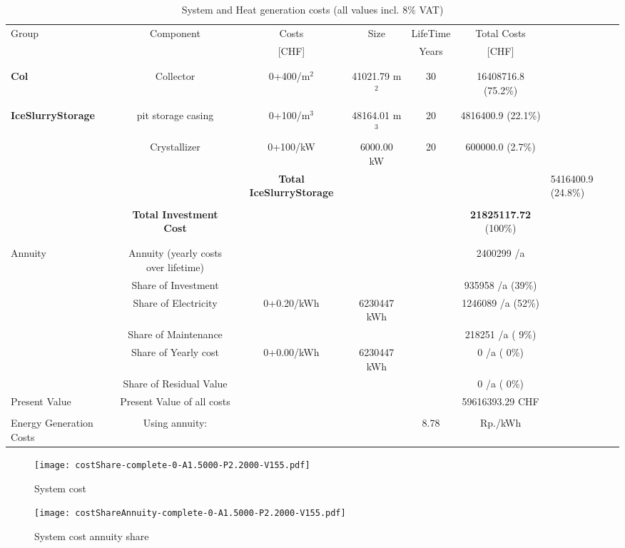 \documentclass[english]{SPFShortReport}
\begin{document}
\begin{table}[!ht]
\centering
\caption{System and Heat generation costs (all values incl. 8$\%$ VAT) }
\begin{adjustbox}{max width =\textwidth}
\begin{tabular}{l | c c c c c } 
\hline
\hline
Group &Component &Costs &Size &LifeTime &Total Costs \\ 
 & &[CHF] & &Years &[CHF]\\ 
\hline
\\
\hline \\
\textbf{Col} & Collector & 0+400/m$^2$ & 41021.79 m$^2$ & 30 & 16408716.8 (75.2\%) \\
\hline \\
\hline \\
\textbf{IceSlurryStorage} & pit storage casing & 0+100/m$^3$ & 48164.01 m$^3$ & 20 & 4816400.9 (22.1\%) \\
 & Crystallizer & 0+100/kW & 6000.00 kW & 20 & 600000.0 (2.7\%) \\
&
 & \textbf{Total IceSlurryStorage} & & & & 5416400.9 (24.8\%) \\
\hline \\
 & \textbf{Total Investment Cost} & & & & \textbf{21825117.72} (100\%) \\ 
\hline \\ 
\hline \\ 
Annuity & Annuity (yearly costs over lifetime)  &&& & 2400299 /a  \\
 & Share of Investment & &&& 935958 /a (39\%) \\
 & Share of Electricity & 0+0.20/kWh & 6230447 kWh &  & 1246089 /a (52\%)\\
 & Share of Maintenance & &&& 218251 /a ( 9\%)\\ 
 & Share of Yearly cost & 0+0.00/kWh & 6230447 kWh & &  0 /a ( 0\%)\\
 & Share of Residual Value &&& &  0 /a ( 0\%)\\
Present Value  & Present Value of all costs  & &&& 59616393.29 CHF \\
\hline \\ 
 Energy Generation Costs & Using annuity: &&& 8.78 & Rp./kWh \\
\hline
\hline
\end{tabular}
\end{adjustbox}
\label{CostsTable}
\end{table}
\begin{figure}[!htbp]
\begin{center}
\texttt{[image: costShare-complete-0-A1.5000-P2.2000-V155.pdf]}
\caption{System cost}
\label{systemCost}
\end{center}
\end{figure}
\begin{figure}[!htbp]
\begin{center}
\texttt{[image: costShareAnnuity-complete-0-A1.5000-P2.2000-V155.pdf]}
\caption{System cost annuity share}
\label{systemCostannuity}
\end{center}
\end{figure}
\end{document}
